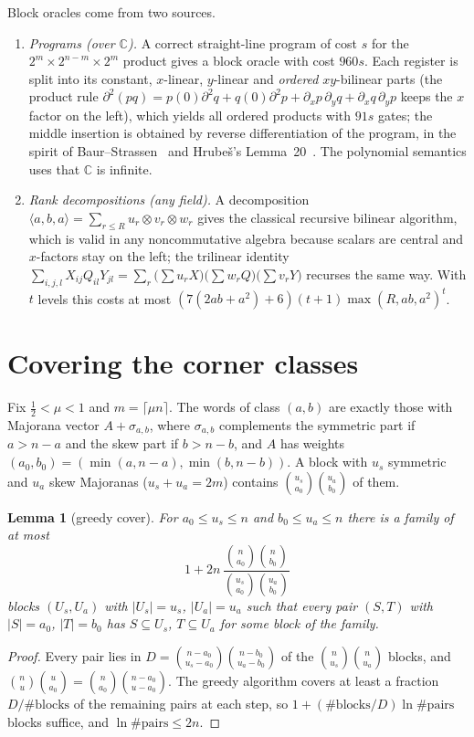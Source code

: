 \documentclass[11pt]{article}
\newtheorem{lemma}[theorem]{Lemma}
\theoremstyle{definition}
\theoremstyle{remark}
\newcommand{\C}{\mathbb{C}}
\begin{document}
Block oracles come from two sources.
\begin{enumerate}[label=(\roman*)]
\item \emph{Programs (over $\C$).} A correct straight-line program of cost $s$ for the
$2^m\times2^{n-m}\times2^m$ product gives a block oracle with cost $960s$. Each register is split into its constant,
$x$-linear, $y$-linear and \emph{ordered} $xy$-bilinear parts (the product rule
$\partial^2(pq)=p(0)\partial^2q+q(0)\partial^2p+\partial_xp\,\partial_yq+\partial_xq\,\partial_yp$ keeps the $x$
factor on the left), which yields all ordered products with $91s$ gates; the middle insertion is obtained by reverse
differentiation of the program, in the spirit of Baur--Strassen~\cite{BaurStrassen1983} and Hrube\v{s}'s
Lemma~20~\cite{Hrubes2026}. The polynomial semantics uses that $\C$ is infinite.
\item \emph{Rank decompositions (any field).} A decomposition
$\langle a,b,a\rangle=\sum_{r\le R}u_r\otimes v_r\otimes w_r$ gives the classical recursive bilinear algorithm,
which is valid in any noncommutative algebra because scalars are central and $x$-factors stay on the left; the
trilinear identity
$\sum_{i,j,l}X_{ij}Q_{il}Y_{jl}=\sum_r\bigl(\sum u_rX\bigr)\bigl(\sum w_rQ\bigr)\bigl(\sum v_rY\bigr)$ recurses the
same way. With $t$ levels this costs at most $(7(2ab+a^2)+6)(t+1)\max(R,ab,a^2)^t$.
\end{enumerate}

\section{Covering the corner classes}\label{sec:cover}

Fix $\tfrac12<\mu<1$ and $m=\lceil\mu n\rceil$. The words of class $(a,b)$ are exactly those with Majorana vector
$A+\sigma_{a,b}$, where $\sigma_{a,b}$ complements the symmetric part if $a>n-a$ and the skew part if $b>n-b$, and
$A$ has weights $(a_0,b_0)=(\min(a,n-a),\min(b,n-b))$. A block with $u_s$ symmetric and $u_a$ skew Majoranas
($u_s+u_a=2m$) contains $\binom{u_s}{a_0}\binom{u_a}{b_0}$ of them.

\begin{lemma}[greedy cover]\label{lem:cover}
For $a_0\le u_s\le n$ and $b_0\le u_a\le n$ there is a family of at most
\[
1+2n\,\frac{\binom n{a_0}\binom n{b_0}}{\binom{u_s}{a_0}\binom{u_a}{b_0}}
\]
blocks $(U_s,U_a)$ with $|U_s|=u_s$, $|U_a|=u_a$ such that every pair $(S,T)$ with $|S|=a_0$, $|T|=b_0$ has
$S\subseteq U_s$, $T\subseteq U_a$ for some block of the family.
\end{lemma}
\begin{proof}
Every pair lies in $D=\binom{n-a_0}{u_s-a_0}\binom{n-b_0}{u_a-b_0}$ of the $\binom n{u_s}\binom n{u_a}$ blocks, and
$\binom n{u}\binom u{a_0}=\binom n{a_0}\binom{n-a_0}{u-a_0}$. The greedy algorithm covers at least a fraction
$D/\#\text{blocks}$ of the remaining pairs at each step, so $1+(\#\text{blocks}/D)\ln\#\text{pairs}$ blocks
suffice, and $\ln\#\text{pairs}\le 2n$.
\end{proof}
\end{document}
